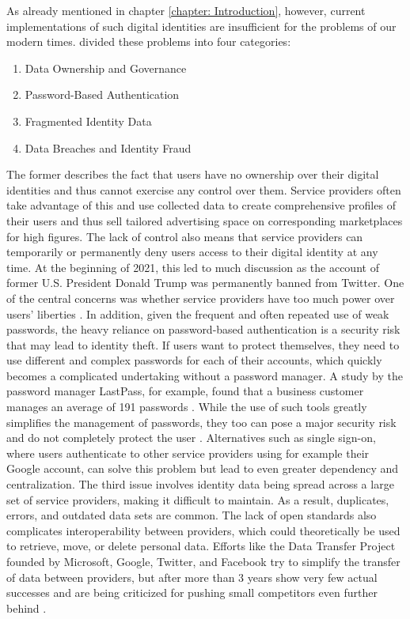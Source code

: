 As already mentioned in chapter \ref{chapter: Introduction}, however, current implementations of such digital identities are insufficient for the problems of our modern times. \cite{soltani_survey_2021} divided these problems into four categories:
\begin{enumerate}
	\item Data Ownership and Governance
	\item Password-Based Authentication
	\item Fragmented Identity Data
	\item Data Breaches and Identity Fraud
\end{enumerate}
The former describes the fact that users have no ownership over their digital identities and thus cannot exercise any control over them. Service providers often take advantage of this and use collected data to create comprehensive profiles of their users and thus sell tailored advertising space on corresponding marketplaces for high figures. The lack of control also means that service providers can temporarily or permanently deny users access to their digital identity at any time. At the beginning of 2021, this led to much discussion as the account of former U.S. President Donald Trump was permanently banned from Twitter. One of the central concerns was whether service providers have too much power over users' liberties \cite{noor_should_2021}. In addition, given the frequent and often repeated use of weak passwords, the heavy reliance on password-based authentication is a security risk that may lead to identity theft. If users want to protect themselves, they need to use different and complex passwords for each of their accounts, which quickly becomes a complicated undertaking without a password manager. A study by the password manager LastPass, for example, found that a business customer manages an average of 191 passwords \cite{steel_lastpass_2017}. While the use of such tools greatly simplifies the management of passwords, they too can pose a major security risk and do not completely protect the user \cite{oesch_that_2020, ormandy_password_2021, toth_you_2021}. Alternatives such as single sign-on, where users authenticate to other service providers using for example their Google account, can solve this problem but lead to even greater dependency and centralization. The third issue involves identity data being spread across a large set of service providers, making it difficult to maintain. As a result, duplicates, errors, and outdated data sets are common. The lack of open standards also complicates interoperability between providers, which could theoretically be used to retrieve, move, or delete personal data. Efforts like the Data Transfer Project founded by Microsoft, Google, Twitter, and Facebook try to simplify the transfer of data between providers, but after more than 3 years show very few actual successes \cite{minor_google_2020, hollington_surprising_2021, lomas_facebooks_2020} and are being criticized for pushing small competitors even further behind \cite[p. 15]{borgogno_data_2018}. \cite[pp. 2-3]{soltani_survey_2021}


